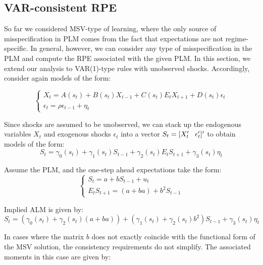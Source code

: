 \documentclass[12pt,reqno]{article}
\numberwithin{equation}{section}
\begin{document}





\subsection{VAR-consistent RPE} 

So far we considered MSV-type of learning, where the only source of misspecification in PLM comes from the fact that expectations are not regime-specific. In general, however, we can consider any type of misspecification in the PLM and compute the RPE associated with the given PLM. In this section, we extend our analysis to VAR(1)-type rules with unobserved shocks. 
Accordingly, consider again models of the form:

$$
\begin{cases}
X_t = A(s_t) + B(s_t) X_{t-1} + C(s_t) E_t X_{t+1} + D(s_t) \epsilon_t \\
\epsilon_t = \rho \epsilon_{t-1} + \eta_t 
\end{cases}
$$

Since shocks are assumed to be unobserved, we can stack up the endogenous variables $X_t $ and exogenous shocks $\epsilon_t $ into a vector $ S_t = [X_t' \hspace{3 mm}\epsilon_t']' $ to obtain models of the form: \\

$$
S_t = \gamma_0 (s_t) + \gamma_1 (s_t) S_{t-1} + \gamma_2(s_t) E_t S_{t+1}  + \gamma_3 (s_t) \eta_t
$$

Assume the PLM, and the one-step ahead expectations take the form: \\

$$
\begin{cases}
S_t = a + b S_{t-1} + u_t \\
E_t S_{t+1} = (a+ba)+ b^2 S_{t-1} 
\end{cases}
$$

Implied ALM is given by: \\

$$ 
S_t = (\gamma_0 (s_t) + \gamma_2 (s_t) (a+ba))+ (\gamma_1 (s_t) +\gamma_2 (s_t) b^2 )S_{t-1} + \gamma_3(s_t) \eta_t 
$$

In cases where the matrix $b $ does not exactly coincide with the functional form of the MSV solution, the consistency requirements do not simplify. The associated moments in this case are given by: \\
\end{document}
